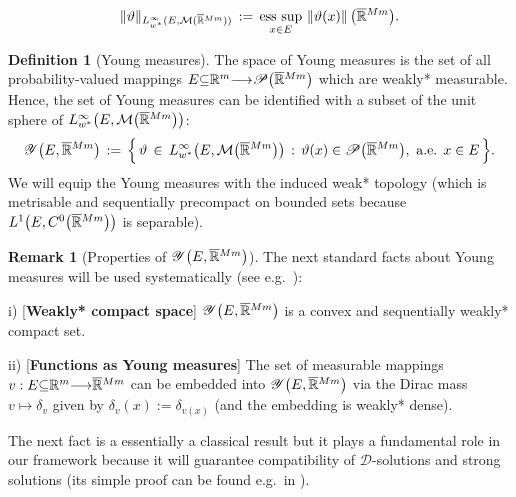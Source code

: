 \documentclass{amsart}
\theoremstyle{definition}
\newtheorem{definition}[theorem]{Definition}
\newtheorem{remark}[theorem]{Remark}
\numberwithin{equation}{section}
\begin{document}
\[
\| \vartheta \|_{L^\infty_{w^*} ( E,{\mathcal{M}} (\smash{\overline{\mathbb{R}}}^{Mm} ) )}\, :=\, \underset{x\in E}{{\textrm{ess}}\,\sup}\, \left\|\vartheta(x) \right\|\big(\smash{\overline{\mathbb{R}}}^{Mm}\big).
\]
\begin{definition}[Young measures] The space of Young measures is the set of all probability-valued mappings  $E{\subseteq} {\mathbb{R}}^m {\longrightarrow} {\mathscr{P}}\big( \smash{\overline{\mathbb{R}}}^{Mm} \big)$ which are weakly* measurable. Hence, the set of Young measures can be identified with a subset of the unit sphere of $L^\infty_{w^*}\big( E,{\mathcal{M}} \big(\smash{\overline{\mathbb{R}}}^{Mm}\big) \big)$:
\[
{\mathscr{Y}}\big(E,\smash{\overline{\mathbb{R}}}^{Mm}\big)\, :=\, \Big\{\, \vartheta\, \in \, L^\infty_{w^*}\big( E,{\mathcal{M}} \big( \smash{\overline{\mathbb{R}}}^{Mm} \big) \big)\, : \, \vartheta(x) \in {\mathscr{P}} \big( \smash{\overline{\mathbb{R}}}^{Mm} \big),\text{ a.e. }x\in E \, \Big\}.
\]
We will equip the Young measures with the induced weak* topology (which is metrisable and sequentially precompact on bounded sets because $L^1\big( E, C^0\big(\smash{\overline{\mathbb{R}}}^{Mm}\big)\big)$ is separable).
\end{definition}

\begin{remark}[Properties of ${\mathscr{Y}}\big(E,\smash{\overline{\mathbb{R}}}^{Mm}\big)$] \label{remark2} The next standard facts about Young measures will be used systematically (see e.g.\ \cite{FG}): 
\smallskip

i) [\textbf{Weakly* compact space}] ${\mathscr{Y}}\big(E,\smash{\overline{\mathbb{R}}}^{Mm}\big)$ is a convex and sequentially weakly* compact set.  

\smallskip

ii) [\textbf{Functions as Young measures}]  The set of  measurable mappings $v : E{\subseteq} {\mathbb{R}}^m {\longrightarrow} \smash{\overline{\mathbb{R}}}^{Mm}$ can be embedded into ${\mathscr{Y}}\big(E,\smash{\overline{\mathbb{R}}}^{Mm}\big)$ via the Dirac mass $v \mapsto {\delta}_v$ given by ${\delta}_v(x):= {\delta}_{v(x)}$ (and the embedding is weakly* dense).  

\end{remark}

The next fact is a essentially a classical result but it plays a fundamental role in our framework because it will guarantee compatibility of ${\mathcal{D}}$-solutions and strong solutions (its simple proof can be found e.g.\ in \cite{K8}).
\end{document}
